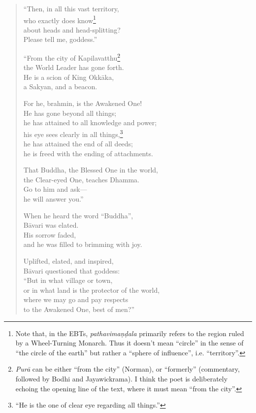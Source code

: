 \documentclass[12pt,openany]{book}%
\begin{document}
\begin{verse}
“Then, in all this vast territory, \\
who exactly does know\footnote{Note that, in the EBTs, \textit{\textsanskrit{pathavimaṇḍala}} primarily refers to the region ruled by a Wheel-Turning Monarch. Thus it doesn’t mean “circle” in the sense of “the circle of the earth” but rather a “sphere of influence”, i.e. “territory”. } \\
about heads and head-splitting? \\
Please tell me, goddess.” 

“From the city of Kapilavatthu\footnote{\textit{\textsanskrit{Purā}} can be either “from the city” (Norman), or “formerly” (commentary, followed by Bodhi and Jayawickrama). I think the poet is deliberately echoing the opening line of the text, where it must mean “from the city”. } \\
the World Leader has gone forth. \\
He is a scion of King \textsanskrit{Okkāka}, \\
a Sakyan, and a beacon. 

For he, brahmin, is the Awakened One! \\
He has gone beyond all things; \\
he has attained to all knowledge and power; \\
his eye sees clearly in all things,\footnote{“He is the one of clear eye regarding all things.” } \\
he has attained the end of all deeds; \\
he is freed with the ending of attachments. 

That Buddha, the Blessed One in the world, \\
the Clear-eyed One, teaches Dhamma. \\
Go to him and ask—\\
he will answer you.” 

When he heard the word “Buddha”, \\
\textsanskrit{Bāvari} was elated. \\
His sorrow faded, \\
and he was filled to brimming with joy. 

Uplifted, elated, and inspired, \\
\textsanskrit{Bāvari} questioned that goddess: \\
“But in what village or town, \\
or in what land is the protector of the world, \\
where we may go and pay respects \\
to the Awakened One, best of men?” 


\end{verse}
\end{document}
